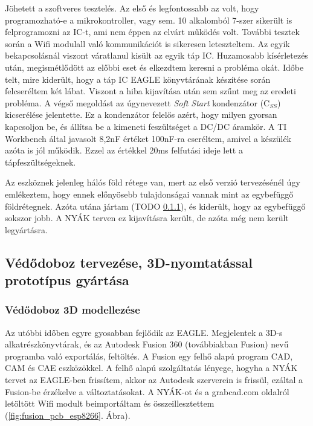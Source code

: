 \documentclass[../main.tex]{subfiles}
\begin{document}
        Jöhetett a szoftveres tesztelés. Az első és legfontossabb az volt, hogy programozható-e a mikrokontroller, vagy sem. 10 alkalomból 7-szer sikerült is felprogramozni az IC-t, ami nem éppen az elvárt működés volt. További tesztek során a Wifi modulall való kommunikációt is sikeresen leteszteltem. Az egyik bekapcsolásnál viszont váratlanul kisült az egyik táp IC. Huzamosabb kísérletezés után, megismétlődött az előbbi eset és elkezdtem keresni a probléma okát. Időbe telt, mire kiderült, hogy a táp IC EAGLE könyvtárának készítése során felcseréltem két lábat. Viszont a hiba kijavítása után sem szűnt meg az eredeti probléma. A végső megoldást az úgynevezett \textit{Soft Start} kondenzátor (C$_{SS}$) kicserélése jelentette. Ez a kondenzátor felelős azért, hogy milyen gyorsan kapcsoljon be, és állítsa be a kimeneti feszültséget a DC/DC áramkör. A TI Workbench által javasolt 8,2nF értéket 100nF-ra cseréltem, amivel a készülék azóta is jól működik. Ezzel az értékkel 20ms felfutási ideje lett a tápfeszültségeknek.
        
        Az eszköznek jelenleg hálós föld rétege van, mert az első verzió tervezésénél úgy emlékeztem, hogy ennek előnyösebb tulajdonságai vannak mint az egybefüggő földrétegnek. Azóta utána jártam (TODO \ref{}), és kiderült, hogy az egybefüggő sokszor jobb. A NYÁK terven ez kijavításra került, de azóta még nem került legyártásra.
        
    \subsection{Védődoboz tervezése, 3D-nyomtatással prototípus gyártása}
    
        \subsubsection{Védődoboz 3D modellezése}
            Az utóbbi időben egyre gyosabban fejlődik az EAGLE. Megjelentek a 3D-s alkatrészkönyvtárak, és az Autodesk Fusion 360 (továbbiakban Fusion) nevű programba való exportálás, feltöltés. A Fusion egy felhő alapú program CAD, CAM és CAE eszközökkel. A felhő alapú szolgáltatás lényege, hogyha a NYÁK tervet az EAGLE-ben frissítem, akkor az Autodesk szerverein is frissül, ezáltal a Fusion-be érzékelve a változtatásokat.
            A NYÁK-ot és a grabcad.com oldalról letöltött Wifi modult beimportáltam és összeillesztettem (\ref{fig:fusion_pcb_esp8266}. Ábra).
            
\end{document}
